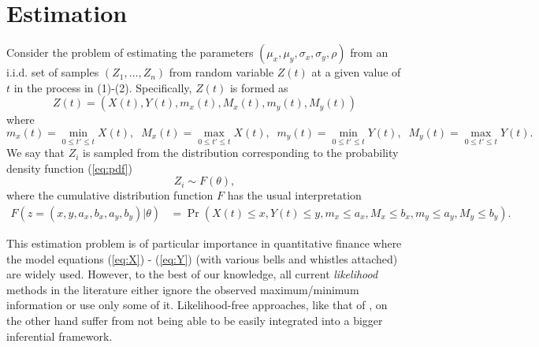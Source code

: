 \documentclass[10pt]{article}
\begin{document}


\section{Estimation}
Consider the problem of estimating the parameters
$(\mu_x, \mu_y, \sigma_x, \sigma_y, \rho)$ from an i.i.d. set of
samples $(Z_1, \ldots, Z_n)$ from random variable $Z(t)$ at a given
value of $t$ in the process in (1)-(2). Specifically, $Z(t)$ is formed
as
$$ Z(t) =( X(t), Y(t), m_x(t), M_x(t), m_y(t), M_y(t)) $$
where 
$$m_x(t)= \min_{0 \le t' \le t} X(t), \;\; 
M_x(t)= \max_{0 \le t' \le t} X(t), \;\; m_y(t)= \min_{0 \le t' \le t}
Y(t), \;\; M_y(t)= \max_{0 \le t' \le t} Y(t). $$ We say that $Z_i$ is
sampled from the distribution corresponding to the probability density
function (\ref{eq:pdf})
\[
  Z_i \sim F(\theta),
\]
where the cumulative distribution function $F$ has the usual interpretation
\begin{align*}
  F(z = (x, y, a_x, b_x, a_y, b_y) | \theta) &= \Pr\left(X(t) \leq x,
    Y(t) \leq y, m_x \leq a_x, M_x \leq b_x, m_y \leq a_y, M_y \leq b_y\right).
\end{align*}

This estimation problem is of particular importance in quantitative
finance where the model equations (\ref{eq:X}) - (\ref{eq:Y}) (with
various bells and whistles attached) are widely used. However, to the
best of our knowledge, all current \textit{likelihood} methods in the
literature either ignore the observed maximum/minimum information or
use only some of it. Likelihood-free approaches, like that of
\cite{rogers1991estimating}, on the other hand suffer from not being
able to be easily integrated into a bigger inferential framework.
\end{document}
